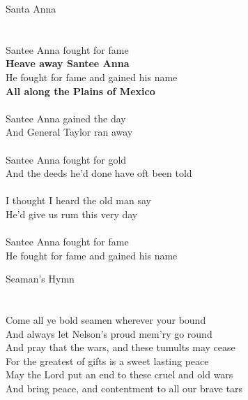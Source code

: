 \documentclass[letterpaper,9pt]{article}
\begin{document}
\newpage
{}
\huge
Santa Anna\\
\\
\LARGE
\noindent
\\Santee Anna fought for fame
\\\textbf{Heave away Santee Anna}
\\He fought for fame and gained his name
\\\textbf{All along the Plains of Mexico}
\\
\\Santee Anna gained the day
\\And General Taylor ran away
\\
\\Santee Anna fought for gold
\\And the deeds he'd done have oft been told
\\
\\I thought I heard the old man say
\\He'd give us rum this very day
\\
\\Santee Anna fought for fame
\\He fought for fame and gained his name

\newpage
{}
\huge
Seaman's Hymn\\
\\
\noindent
\\Come all ye bold seamen wherever your bound
\\And always let Nelson's proud mem'ry go round
\\And pray that the wars, and these tumults may cease
\\For the greatest of gifts is a sweet lasting peace
\\May the Lord put an end to these cruel and old wars
\\And bring peace, and contentment to all our brave tars
\end{document}
